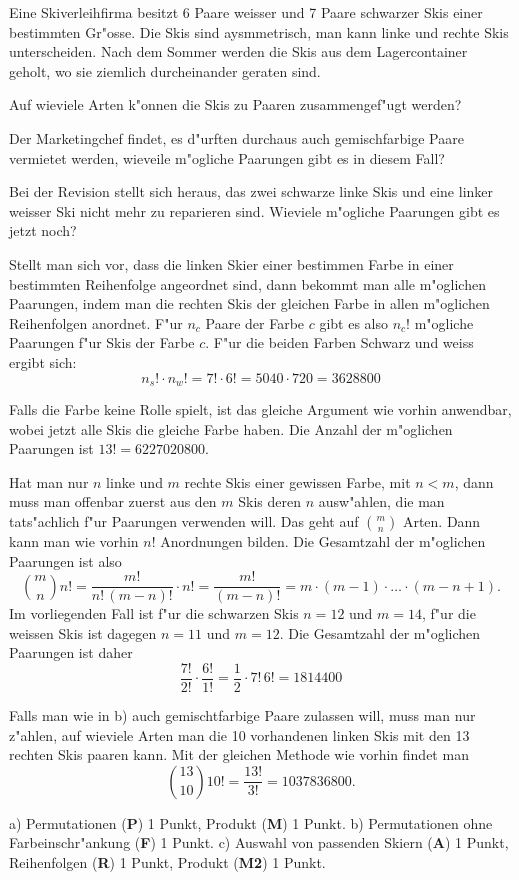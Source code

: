 Eine Skiverleihfirma besitzt 6 Paare weisser und 7 Paare schwarzer Skis
einer bestimmten Gr"osse. Die Skis sind aysmmetrisch, man kann linke
und rechte Skis unterscheiden.
Nach dem Sommer werden die Skis aus dem Lagercontainer geholt, 
wo sie ziemlich durcheinander geraten sind.
\begin{teilaufgaben}
\item Auf wieviele Arten k"onnen die Skis zu Paaren zusammengef"ugt werden?
\item Der Marketingchef findet, es d"urften durchaus auch gemischfarbige Paare
vermietet werden, wieveile m"ogliche Paarungen gibt es in diesem
Fall?
\item Bei der Revision stellt sich heraus, das zwei schwarze linke Skis
und eine linker weisser Ski nicht mehr zu reparieren sind. Wieviele
m"ogliche Paarungen gibt es jetzt noch?
\end{teilaufgaben}

\begin{loesung}
\begin{teilaufgaben}
\item Stellt man sich vor, dass die linken Skier einer bestimmen
Farbe in einer bestimmten
Reihenfolge angeordnet sind, dann bekommt man alle m"oglichen Paarungen,
indem man die rechten Skis der gleichen Farbe in allen m"oglichen
Reihenfolgen anordnet.
F"ur $n_c$ Paare der Farbe $c$ gibt es also $n_c!$ m"ogliche
Paarungen f"ur Skis der Farbe $c$. F"ur die beiden Farben Schwarz
und weiss ergibt sich:
\[
n_s!\cdot n_w!=7!\cdot 6!=5040\cdot 720=3628800
\]
\item
Falls die Farbe keine Rolle spielt, ist das gleiche Argument wie vorhin
anwendbar, wobei jetzt alle Skis die gleiche Farbe haben. Die Anzahl
der m"oglichen Paarungen ist $13!=6227020800$.
\item
Hat man nur $n$ linke und $m$ rechte Skis einer gewissen Farbe, mit $n<m$,
dann muss man offenbar zuerst aus den $m$ Skis deren $n$ ausw"ahlen,
die man tats"achlich f"ur Paarungen verwenden will. Das geht auf $\binom{m}{n}$
Arten. Dann kann man wie vorhin $n!$ Anordnungen bilden. Die Gesamtzahl
der m"oglichen Paarungen ist also 
\[
\binom{m}{n}n!=\frac{m!}{n!\,(m-n)!}\cdot n!=\frac{m!}{(m-n)!}
=
m\cdot(m-1)\cdot\dots\cdot(m-n+1).
\]
Im vorliegenden Fall ist f"ur die schwarzen Skis $n=12$ und $m=14$,
f"ur die weissen Skis ist dagegen $n=11$ und $m=12$.
Die Gesamtzahl der m"oglichen Paarungen ist daher
\[
\frac{7!}{2!}\cdot \frac{6!}{1!}
=\frac12\cdot 7!\,6!=1814400
\]
\end{teilaufgaben}
Falls man wie in b) auch gemischtfarbige Paare zulassen will, muss
man nur z"ahlen, auf wieviele Arten man die 10 vorhandenen
linken Skis mit den 13 rechten Skis paaren kann. Mit der gleichen
Methode wie vorhin findet man
\[
\binom{13}{10}10!=\frac{13!}{3!}=1037836800.
\]
\end{loesung}

\begin{bewertung}
a) Permutationen ({\bf P}) 1 Punkt, Produkt ({\bf M}) 1 Punkt.
b) Permutationen ohne Farbeinschr"ankung ({\bf F}) 1 Punkt.
c) Auswahl von passenden Skiern ({\bf A}) 1 Punkt,
Reihenfolgen ({\bf R}) 1 Punkt, Produkt ({\bf M2}) 1 Punkt.
\end{bewertung}
